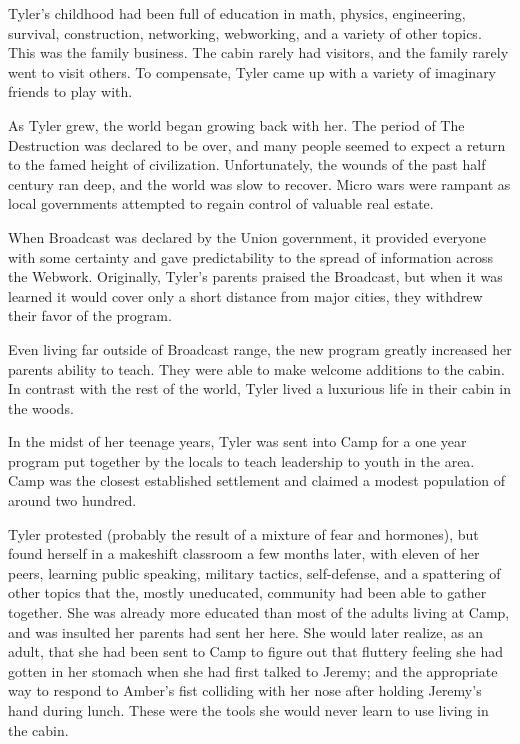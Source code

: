 \documentclass[courier]{sffms}
\begin{document}
Tyler's childhood had been full of education in
math, physics, engineering, survival, construction,
networking, webworking, and a variety of other
topics. This was the family business. The cabin
rarely had visitors, and the family rarely went to
visit others. To compensate, Tyler came up with
a variety of imaginary friends to play with.

As Tyler grew, the world began growing back
with her. The period of The Destruction was 
declared to be over, and many people seemed
to expect a return to the famed height of civilization.
Unfortunately, the wounds of the past half
century ran deep, and the world was slow to
recover. Micro wars were rampant as local
governments attempted to regain control of
valuable real estate.

When Broadcast was declared by the Union
government, it provided everyone with some
certainty and gave predictability to the spread
of information across the Webwork. Originally,
Tyler's parents praised the Broadcast, but when
it was learned it would cover only a short distance
from major cities, they withdrew their favor
of the program.

Even living far outside of Broadcast range, 
the new program greatly increased her parents
ability to teach. They were able to make
welcome additions to the cabin. In contrast
with the rest of the world, Tyler lived a luxurious
life in their cabin in the woods.

In the midst of her teenage years, Tyler was
sent into Camp for a one year program put
together by the locals to teach leadership to
youth in the area. Camp was the closest
established settlement and claimed a
modest population of around two hundred.

Tyler protested (probably the result of a mixture
of fear and hormones), but found herself in a
makeshift classroom a few months later, with
eleven of her peers, learning public speaking,
military tactics, self-defense, and a spattering
of other topics that the, mostly uneducated,
community had been able to gather together.
She was already more educated than most of
the adults living at Camp, and was insulted her
parents had sent her here. She would later
realize, as an adult, that she had been sent to
Camp to figure out that fluttery feeling she had
gotten in her stomach when she had first talked
to Jeremy; and the appropriate way to respond
to Amber's fist colliding with her nose after
holding Jeremy's hand during lunch. These were
the tools she would never learn to use living
in the cabin.
\end{document}
